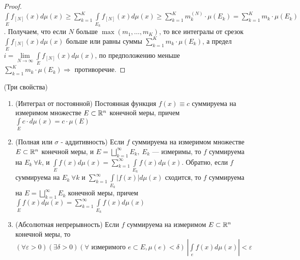 \begin{proof}
$\int\limits_{E}f_{[N]}(x)d\mu(x)\geqslant\sum\limits_{k=1}^K\int\limits_{E_k}f_{[N]}(x)d\mu(x) 
\geqslant
\sum\limits_{k=1}^K m_k^{(N)}\cdot \mu(E_k)
=
\sum\limits_{k=1}^Km_k\cdot \mu(E_k)$. Получаем, что если $N$ больше $\max(m_1, \ldots, m_K)$, то все интегралы от срезок $\int\limits_{E}f_{[N]}(x)d\mu(x)$ больше или равны суммы $\sum\limits_{k=1}^Km_k\cdot \mu(E_k)$, а предел $i = \lim\limits_{N \to \infty} \int\limits_{E}f_{[N]}(x)d\mu(x)$, по предположению меньше $\sum\limits_{k=1}^Km_k\cdot\mu(E_k) \Rightarrow $ противоречие.
\end{proof}
\newpage
\begin{theorem}(Три свойства)
\begin{enumerate}
\item (Интеграл от постоянной) Постоянная функция $f(x) \equiv c$ суммируема на измеримом множестве $E\subset \R^n$ конечной меры, причем $\int\limits_Ec\cdot d\mu(x)=c\cdot\mu(E)$
\item (Полная или $\sigma$ - аддитивность) Если $f$ суммируема на измеримом множестве $E\subset \R^n$ конечной меры, и $E=\bigsqcup\limits_{k=1}^\infty E_k,\ E_k$ --- измеримы, то $f$ суммируема на $E_k\ \forall k$, и $\int\limits_Ef(x)d\mu(x) = \sum\limits_{k=1}^\infty\int\limits_{E_k} f(x)d\mu(x)$. Обратно, если $f$ суммируема на $E_k\ \forall k$ и $\sum\limits_{k=1}^\infty\int\limits_{E_k}| f(x)|d\mu(x)$ сходится, то $f$ суммируема на $E=\bigsqcup\limits_{k=1}^{\infty}E_k$ конечной меры, причем $\int\limits_Ef(x)d\mu(x) = \sum\limits_{k=1}^\infty\int\limits_{E_k} f(x)d\mu(x)$
\item (Абсолютная непрерывность) Если $f$ суммируема на измеримом $E\subset \R^n$ конечной меры, то $(\forall \varepsilon >0)(\exists \delta>0)(\forall\text{ измеримого } e\subset E, \mu(e)<\delta)\  \left|\int\limits_e f(x)d\mu(x)\right|<\varepsilon$
 \end{enumerate}
\end{theorem}


